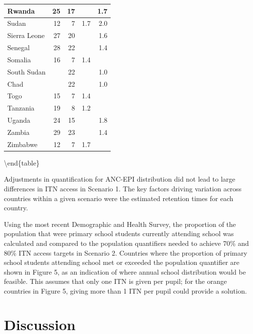 \documentclass[review,
3p]{elsarticle} %
\begin{document}
\begin{tabular}[t]{l|r|r|r|r}
Rwanda & 25 & 17 &  & 1.7\\
\hline
Sudan & 12 & 7 & 1.7 & 2.0\\
\hline
Sierra Leone & 27 & 20 &  & 1.6\\
\hline
Senegal & 28 & 22 &  & 1.4\\
\hline
Somalia & 16 & 7 & 1.4 & \\
\hline
South Sudan &  & 22 &  & 1.0\\
\hline
Chad &  & 22 &  & 1.0\\
\hline
Togo & 15 & 7 & 1.4 & \\
\hline
Tanzania & 19 & 8 & 1.2 & \\
\hline
Uganda & 24 & 15 &  & 1.8\\
\hline
Zambia & 29 & 23 &  & 1.4\\
\hline
Zimbabwe & 12 & 7 & 1.7 & \\
\hline
\end{tabular}

\textbackslash end\{table\}

Adjustments in quantification for ANC-EPI distribution did not lead to
large differences in ITN access in Scenario 1. The key factors driving
variation across countries within a given scenario were the estimated
retention times for each country.

Using the most recent Demographic and Health Survey, the proportion of
the population that were primary school students currently attending
school was calculated and compared to the population quantifiers needed
to achieve 70\% and 80\% ITN access targets in Scenario 2. Countries
where the proportion of primary school students attending school met or
exceeded the population quantifier are shown in Figure 5, as an
indication of where annual school distribution would be feasible. This
assumes that only one ITN is given per pupil; for the orange countries
in Figure 5, giving more than 1 ITN per pupil could provide a solution.

\hypertarget{discussion}{%
\section{Discussion}\label{discussion}}
\end{document}
